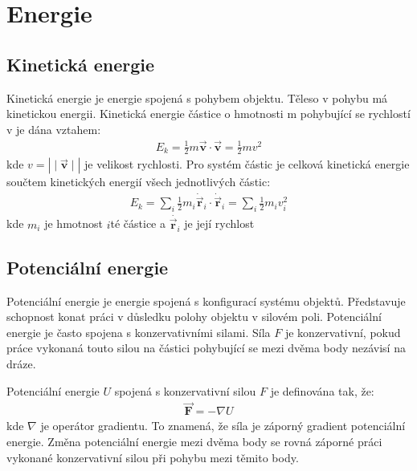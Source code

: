 \documentclass[letterpaper,10pt,english]{jupyterBook}
\begin{document}
\section{Energie}
\label{\detokenize{Prednasky/1_4_Energie:energie}}

\subsection{Kinetická energie}
\label{\detokenize{Prednasky/1_4_Energie:kineticka-energie}}
\sphinxAtStartPar
Kinetická energie je energie spojená s pohybem objektu. Těleso v pohybu má kinetickou energii. Kinetická energie částice o hmotnosti m pohybující se rychlostí v je dána vztahem:
\begin{equation*}
\begin{split}E_k = \frac{1}{2} m \vec{\mathbf{v}} \cdot \vec{\mathbf{v}}= \frac{1}{2} m v^2\end{split}
\end{equation*}
\sphinxAtStartPar
kde \(v=|∣\vec{\mathbf{v}}∣|\) je velikost rychlosti. Pro systém částic je celková kinetická energie součtem kinetických energií všech jednotlivých částic:
\begin{equation*}
\begin{split}E_k = \sum_i \frac{1}{2} m_i \dot{\vec{\mathbf{r}}}_i \cdot \dot{\vec{\mathbf{r}}}_i = \sum_i \frac{1}{2} m_i v_i^2\end{split}
\end{equation*}
\sphinxAtStartPar
kde \(m_i\) je hmotnost \(i\)\sphinxhyphen{}té částice a \(\dot{\vec{\mathbf{r}}_i}\) je její rychlost


\subsection{Potenciální energie}
\label{\detokenize{Prednasky/1_4_Energie:potencialni-energie}}
\sphinxAtStartPar
Potenciální energie je energie spojená s konfigurací systému objektů. Představuje schopnost konat práci v důsledku polohy objektu v silovém poli. Potenciální energie je často spojena s konzervativními silami. Síla \(F\) je konzervativní, pokud práce vykonaná touto silou na částici pohybující se mezi dvěma body nezávisí na dráze.

\sphinxAtStartPar
Potenciální energie \(U\) spojená s konzervativní silou \(F\) je definována tak, že:
\begin{equation*}
\begin{split}\mathbf{\vec{F}} = -\nabla U\end{split}
\end{equation*}
\sphinxAtStartPar
kde \(\nabla\) je operátor gradientu. To znamená, že síla je záporný gradient potenciální energie. Změna potenciální energie mezi dvěma body se rovná záporné práci vykonané konzervativní silou při pohybu mezi těmito body.
\end{document}
